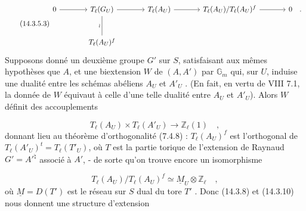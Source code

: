 \begin{equation}\tag{14.3.5.3}
\begin{tikzcd}[row sep=large, column sep=large]
0 \arrow[r] & T_\ell(G_U) \arrow[r] \arrow[d, dash, "\wr"'] & T_\ell(A_U) \arrow[r] & T_\ell(A_U)/T_\ell(A_U)^f \arrow[r] & 0 \quad . \\
& T_\ell(A_U)^f
\end{tikzcd}
\end{equation}
Supposons donné un deuxième groupe $G'$ sur $S$, satisfaisant aux mêmes hypothèses que $A$, et une biextension $W$ de $(A,A')$ par $\mathbb{G}_m$ qui, sur $U$, induise une dualité entre les schémas abéliens $A_U$ et $A'_U$ . (En fait, en vertu de VIII 7.1, la donnée de $W$ équivaut à celle d'une telle dualité entre $A_U$ et $A'_U$). Alors $W$ définit des accouplements

\begin{equation}\tag{14.3.5.4}
T_\ell(A_U) \times T_\ell(A'_U) \longrightarrow \mathbb{Z}_\ell(1) \quad ,
\end{equation}
donnant lieu au théorème d'orthogonalité (7.4.8) : $T_\ell(A_U)^f$ est l'orthogonal de $T_\ell(A'_U)^t = T_\ell(T'_U)$, où $T$ est la partie torique de l'extension de Raynaud $G' = {A'}^{\natural}$ associé à $A'$, - de sorte qu'on trouve encore un isomorphisme

\begin{equation}\tag{14.3.5.5}
T_\ell(A_U)/T_\ell(A_U)^f \simeq \underline{M}_U \otimes \mathbb{Z}_\ell \quad ,
\end{equation}
où $\underline{M} = D(T')$ est le réseau sur $S$ dual du tore $T'$ . Donc (14.3.8) et (14.3.10) nous donnent une structure d'extension

